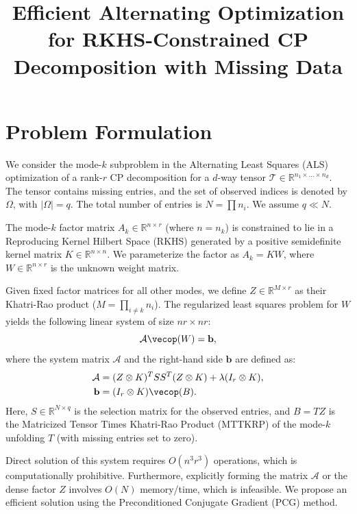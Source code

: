 \documentclass[11pt]{article}
\title{Efficient Alternating Optimization for RKHS-Constrained CP Decomposition with Missing Data}
\author{}
\date{}
\begin{document}
\maketitle

\section{Problem Formulation}

We consider the mode-$k$ subproblem in the Alternating Least Squares (ALS) optimization of a rank-$r$ CP decomposition for a $d$-way tensor $\mathcal{T} \in \mathbb{R}^{n_1 \times \dots \times n_d}$. The tensor contains missing entries, and the set of observed indices is denoted by $\Omega$, with $|\Omega| = q$. The total number of entries is $N = \prod n_i$. We assume $q \ll N$.

The mode-$k$ factor matrix $A_k \in \mathbb{R}^{n \times r}$ (where $n = n_k$) is constrained to lie in a Reproducing Kernel Hilbert Space (RKHS) generated by a positive semidefinite kernel matrix $K \in \mathbb{R}^{n \times n}$. We parameterize the factor as $A_k = KW$, where $W \in \mathbb{R}^{n \times r}$ is the unknown weight matrix. 

Given fixed factor matrices for all other modes, we define $Z \in \mathbb{R}^{M \times r}$ as their Khatri-Rao product ($M = \prod_{i \ne k} n_i$). The regularized least squares problem for $W$ yields the following linear system of size $nr \times nr$:
\begin{equation}
    \mathcal{A} \vecop(W) = \mathbf{b},
    \label{eq:system}
\end{equation}
where the system matrix $\mathcal{A}$ and the right-hand side $\mathbf{b}$ are defined as:
\begin{align}
    \mathcal{A} &= (Z \otimes K)^T S S^T (Z \otimes K) + \lambda (I_r \otimes K), \\
    \mathbf{b} &= (I_r \otimes K) \vecop(B).
\end{align}
Here, $S \in \mathbb{R}^{N \times q}$ is the selection matrix for the observed entries, and $B = T Z$ is the Matricized Tensor Times Khatri-Rao Product (MTTKRP) of the mode-$k$ unfolding $T$ (with missing entries set to zero). 

Direct solution of this system requires $O(n^3 r^3)$ operations, which is computationally prohibitive. Furthermore, explicitly forming the matrix $\mathcal{A}$ or the dense factor $Z$ involves $O(N)$ memory/time, which is infeasible. We propose an efficient solution using the Preconditioned Conjugate Gradient (PCG) method.
\end{document}
